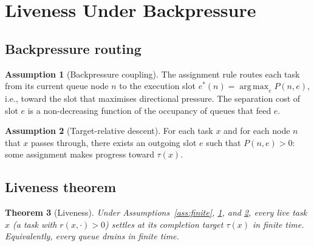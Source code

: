 \documentclass[11pt,twocolumn,a4paper]{article}
\theoremstyle{plain}
\newtheorem{theorem}{Theorem}[section]
\theoremstyle{definition}
\newtheorem{assumption}[theorem]{Assumption}
\theoremstyle{remark}
\newcommand{\pres}{P}
\DeclareMathOperator*{\argmax}{arg\,max}
\begin{document}
\section{Liveness Under Backpressure}
\label{sec:liveness}

\subsection{Backpressure routing}

\begin{assumption}[Backpressure coupling]
\label{ass:backpressure}
The assignment rule routes each task from its current queue node $n$ to the execution slot $e^*(n) = \argmax_{e} \pres(n, e)$, i.e., toward the slot that maximises directional pressure. The separation cost of slot $e$ is a non-decreasing function of the occupancy of queues that feed $e$.
\end{assumption}

\begin{assumption}[Target-relative descent]
\label{ass:descent}
For each task $x$ and for each node $n$ that $x$ passes through, there exists an outgoing slot $e$ such that $\pres(n, e) > 0$: some assignment makes progress toward $\tau(x)$.
\end{assumption}

\subsection{Liveness theorem}

\begin{theorem}[Liveness]
\label{thm:liveness}
Under Assumptions~\ref{ass:finite}, \ref{ass:backpressure}, and \ref{ass:descent}, every live task $x$ (a task with $r(x, \cdot) > 0$) settles at its completion target $\tau(x)$ in finite time. Equivalently, every queue drains in finite time.
\end{theorem}
\end{document}
